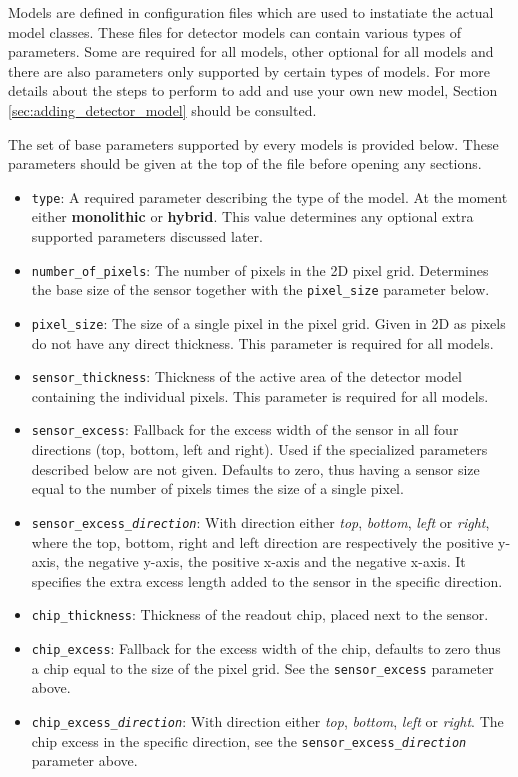 Models are defined in configuration files which are used to instatiate the actual model classes. These files for detector models can contain various types of parameters. Some are required for all models, other optional for all models and there are also parameters only supported by certain types of models. For more details about the steps to perform to add and use your own new model, Section \ref{sec:adding_detector_model} should be consulted.

The set of base parameters supported by every models is provided below. These parameters should be given at the top of the file before opening any sections.
\begin{itemize}
\item \texttt{type}: A required parameter describing the type of the model. At the moment either \textbf{monolithic} or \textbf{hybrid}. This value determines any optional extra supported parameters discussed later.
\item \texttt{number\_of\_pixels}: The number of pixels in the 2D pixel grid. Determines the base size of the sensor together with the \texttt{pixel\_size} parameter below.
\item \texttt{pixel\_size}: The size of a single pixel in the pixel grid. Given in 2D as pixels do not have any direct thickness. This parameter is required for all models. 
\item \texttt{sensor\_thickness}: Thickness of the active area of the detector model containing the individual pixels. This parameter is required for all models.
\item \texttt{sensor\_excess}: Fallback for the excess width of the sensor in all four directions (top, bottom, left and right). Used if the specialized parameters described below are not given. Defaults to zero, thus having a sensor size equal to the number of pixels times the size of a single pixel.
\item \texttt{sensor\_excess\_\textit{direction}}: With direction either \textit{top}, \textit{bottom}, \textit{left} or \textit{right}, where the top, bottom, right and left direction are respectively the positive y-axis, the negative y-axis, the positive x-axis and the negative x-axis. It specifies the extra excess length added to the sensor in the specific direction.
\item \texttt{chip\_thickness}: Thickness of the readout chip, placed next to the sensor.
\item \texttt{chip\_excess}: Fallback for the excess width of the chip, defaults to zero thus a chip equal to the size of the pixel grid. See the \texttt{sensor\_excess} parameter above.
\item \texttt{chip\_excess\_\textit{direction}}: With direction either \textit{top}, \textit{bottom}, \textit{left} or \textit{right}. The chip excess in the specific direction, see the \texttt{sensor\_excess\_\textit{direction}} parameter above.
\end{itemize}

